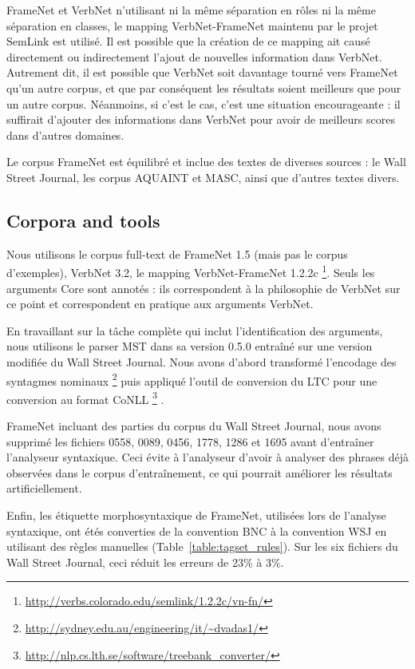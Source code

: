FrameNet et VerbNet n'utilisant ni la même séparation en rôles ni la même
séparation en classes, le mapping VerbNet-FrameNet maintenu par le projet
SemLink est utilisé. Il est possible que la création de ce mapping ait causé
directement ou indirectement l'ajout de nouvelles information dans VerbNet.
Autrement dit, il est possible que VerbNet soit davantage tourné vers FrameNet
qu'un autre corpus, et que par conséquent les résultats soient meilleurs que
pour un autre corpus. Néanmoins, si c'est le cas, c'est une situation
encourageante : il suffirait d'ajouter des informations dans VerbNet pour avoir
de meilleurs scores dans d'autres domaines.

Le corpus FrameNet est équilibré et inclue des textes de diverses sources : le
Wall Street Journal, les corpus AQUAINT et MASC, ainsi que d'autres textes
divers.

\subsection{Corpora and tools}

Nous utilisons le corpus full-text de FrameNet 1.5 (mais pas le corpus
d'exemples), VerbNet 3.2, le mapping VerbNet-FrameNet 1.2.2c
\footnote{\url{http://verbs.colorado.edu/semlink/1.2.2c/vn-fn/}}. Seuls les
arguments Core sont annotés : ils correspondent à la philosophie de VerbNet sur
ce point et correspondent en pratique aux arguments VerbNet.

En travaillant sur la tâche complète qui inclut l'identification des arguments,
nous utilisons le parser MST dans sa version 0.5.0
\citep{mcdonald2006multilingual} entraîné sur une version modifiée du Wall
Street Journal. Nous avons d'abord transformé l'encodage des syntagmes nominaux
\footnote{\url{http://sydney.edu.au/engineering/it/~dvadas1/}}
\citep{vadas2007adding} puis appliqué l'outil de conversion du LTC pour une
conversion au format CoNLL
\footnote{\url{http://nlp.cs.lth.se/software/treebank_converter/}}
\citep{johansson2007extended}.

FrameNet incluant des parties du corpus du Wall Street Journal, nous avons
supprimé les fichiers 0558, 0089, 0456, 1778, 1286 et 1695 avant d'entraîner
l'analyseur syntaxique. Ceci évite à l'analyseur d'avoir à analyser des phrases
déjà observées dans le corpus d'entraînement, ce qui pourrait améliorer les
résultats artificiellement.

Enfin, les étiquette morphosyntaxique de FrameNet, utilisées lors de l'analyse
syntaxique, ont étés converties de la convention BNC à la convention WSJ en
utilisant des règles manuelles (Table~\ref{table:tagset_rules}). Sur les six
fichiers du Wall Street Journal, ceci réduit les erreurs de 23\% à 3\%.

